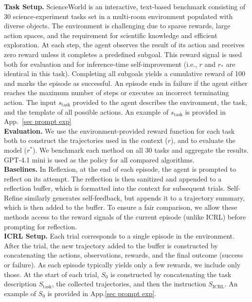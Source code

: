 \documentclass{article} %
\newcommand{\0}{\mathbf{0}}
\newcommand{\icrl}{\text{ICRL}}
\begin{document}
\textbf{Task Setup.} 
ScienceWorld \citep{wang_scienceworld_2022} is an interactive, text-based benchmark consisting of 30 science-experiment tasks set in a multi-room environment populated with diverse objects. 
The environment is challenging due to sparse rewards, large action spaces, and the requirement for scientific knowledge and efficient exploration. At each step, the agent observes the result of its action and receives zero reward unless it completes a predefined subgoal. This reward signal is used both for evaluation and for inference-time self-improvement (i.e., $r$ and $r_*$ are identical in this task). Completing all subgoals yields a cumulative reward of 100 and marks the episode as successful. An episode ends in failure if the agent either reaches the maximum number of steps or executes an incorrect terminating action. 
The input $s_\text{task}$ provided to the agent describes the environment, the task, and the template of all possible actions. An example of $s_\text{task}$ is provided in App.~\ref{sec prompt exp} \\
\textbf{Evaluation.} 
We use the environment-provided reward function for each task both to construct the trajectories used in the context ($r$), and to evaluate the model ($r^*$). We benchmark each method on all 30 tasks and aggregate the results. GPT-4.1 mini is used as the policy for all compared algorithms. \\
\textbf{Baselines.}
In Reflexion, at the end of each episode, the agent is prompted to reflect on its attempt. The reflection is then sanitized and appended to a reflection buffer, which is formatted into the context for subsequent trials. Self-Refine similarly generates self-feedback, but appends it to a trajectory summary, which is then added to the buffer.
To ensure a fair comparison, we allow these methods access to the reward signals of the current episode (unlike ICRL) before prompting for reflection. \\
\textbf{ICRL Setup.} 
Each trial corresponds to a single episode in the environment. After the trial, the new trajectory added to the buffer is constructed by concatenating the actions, observations, rewards, and the final outcome (success or failure). As each episode typically yields only a few rewards, we include only those. At the start of each trial, $S_0$ is constructed by concatenating the task description $S_\text{task}$, the collected trajectories, and then the instruction $S_\icrl$. An example of $S_0$ is provided in App.\ref{sec prompt exp}. \\
\end{document}

